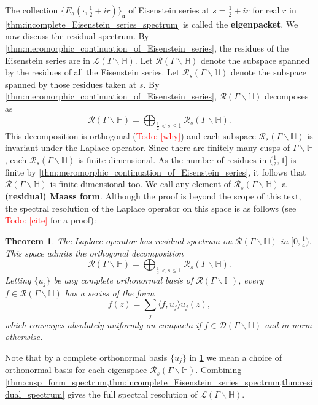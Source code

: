 \documentclass[12pt]{book}
\newtheorem{theorem}{Theorem}[section]
\theoremstyle{definition}\newframedtheorem{method}{Method}
\newcommand{\mf}{\mathfrak}
\newcommand{\mc}{\mathcal}
\renewcommand{\H}{\mathbb{H}}
\newcommand{\G}{\Gamma}
\newcommand{\bigop}{\bigoplus}
\newcommand{\<}{\langle}
\renewcommand{\>}{\rangle}
\newcommand{\GH}{\G\backslash\H}
\newcommand{\todo}[1]{\textcolor{red}{\sf Todo: [#1]}}
\begin{document}
      The collection $\{E_{\mf{a}}(\cdot,\frac{1}{2}+ir)\}_{\mf{a}}$ of Eisenstein series at $s = \frac{1}{2}+ir$ for real $r$ in \cref{thm:incomplete_Eisenstein_series_spectrum} is called the \textbf{eigenpacket}. We now discuss the residual spectrum. By \cref{thm:meromorphic_continuation_of_Eisenstein_series}, the residues of the Eisenstein series are in $\mc{L}(\GH)$. Let $\mc{R}(\GH)$ denote the subspace spanned by the residues of all the Eisenstein series. Let $\mc{R}_{s}(\GH)$ denote the subspace spanned by those residues taken at $s$. By \cref{thm:meromorphic_continuation_of_Eisenstein_series}, $\mc{R}(\GH)$ decomposes as
      \[
        \mc{R}(\GH) = \bigop_{\frac{1}{2} < s \le 1}\mc{R}_{s}(\GH).
      \]
      This decomposition is orthogonal (\todo{why}) and each subspace $\mc{R}_{s}(\GH)$ is invariant under the Laplace operator. Since there are finitely many cusps of $\GH$, each $\mc{R}_{s}(\GH)$ is finite dimensional. As the number of residues in $(\frac{1}{2},1]$ is finite by \cref{thm:meromorphic_continuation_of_Eisenstein_series}, it follows that $\mc{R}(\GH)$ is finite dimensional too. We call any element of $\mc{R}_{s}(\GH)$ a \textbf{(residual) Maass form}. Although the proof is beyond the scope of this text, the spectral resolution of the Laplace operator on this space is as follows (see \todo{cite} for a proof):

      \begin{theorem}\label{thm:residual_spectrum}
        The Laplace operator has residual spectrum on $\mc{R}(\GH)$ in $[0,\frac{1}{4})$. This space admits the orthogonal decomposition
        \[
          \mc{R}(\GH) = \bigop_{\frac{1}{2} < s \le 1}\mc{R}_{s}(\GH).
        \]
        Letting $\{u_{j}\}$ be any complete orthonormal basis of $\mc{R}(\GH)$, every $f \in \mc{R}(\GH)$ has a series of the form
        \[
          f(z) = \sum_{j}\<f,u_{j}\>u_{j}(z),
        \]
        which converges absolutely uniformly on compacta if $f \in \mc{D}(\GH)$ and in norm otherwise.
      \end{theorem}

      Note that by a complete orthonormal basis $\{u_{j}\}$ in \cref{thm:residual_spectrum} we mean a choice of orthonormal basis for each eigenspace $\mc{R}_{s}(\GH)$. Combining \cref{thm:cusp_form_spectrum,thm:incomplete_Eisenstein_series_spectrum,thm:residual_spectrum} gives the full spectral resolution of $\mc{L}(\GH)$.
\end{document}
